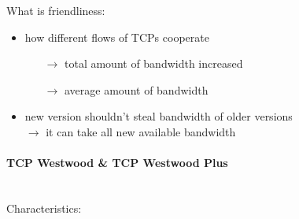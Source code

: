 What is friendliness:
\begin{itemize}
    \item how different flows of TCPs cooperate
    \begin{itemize}
        \item[$\rightarrow$] total amount of bandwidth increased
        \item[$\rightarrow$] average amount of bandwidth
    \end{itemize}
    \item new version shouldn't steal bandwidth of older versions\\$\rightarrow$ it can
    take all new available bandwidth
\end{itemize}

\paragraph{TCP Westwood \& TCP Westwood Plus}\mbox{}\\[0.2cm]
Characteristics:
